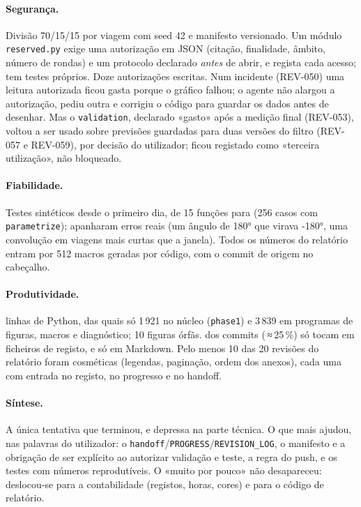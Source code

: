 \documentclass[11pt,a4paper]{article}
\begin{document}
\paragraph{Segurança.} Divisão 70/15/15 por viagem com seed 42 e manifesto versionado.
Um módulo \texttt{reserved.py} exige uma autorização em JSON (citação, finalidade, âmbito, número
de rondas) e um protocolo declarado \emph{antes} de abrir, e regista cada acesso; tem testes
próprios. Doze autorizações escritas. Num incidente (REV-050) uma leitura autorizada ficou gasta
porque o gráfico falhou; o agente não alargou a autorização, pediu outra e corrigiu o código para
guardar os dados antes de desenhar. Mas o \texttt{validation}, declarado «gasto» após a medição
final (REV-053), voltou a ser usado sobre previsões guardadas para duas versões do filtro (REV-057
e REV-059), por decisão do utilizador; ficou registado como «terceira utilização», não bloqueado.

\paragraph{Fiabilidade.} Testes sintéticos desde o primeiro dia, de 15 funções para
\mQuatroFuncTestes{} (256 casos com \texttt{parametrize}); apanharam erros reais (um ângulo de
180° que virava -180°, uma convolução em viagens mais curtas que a janela). Todos os números do
relatório entram por 512 macros geradas por código, com o commit de origem no cabeçalho.

\paragraph{Produtividade.} \mQuatroLinhasPy{} linhas de Python, das quais só 1\,921 no
núcleo (\texttt{phase1}) e 3\,839 em programas de figuras, macros e diagnóstico; 10 figuras
órfãs. \mQuatroRegisto{} dos \mQuatroCommits{} commits (\,≈\,25\,\%) só tocam em ficheiros de
registo, e \mQuatroSoMd{} só em Markdown. Pelo menos 10 das 20 revisões do relatório foram
cosméticas (legendas, paginação, ordem dos anexos), cada uma com entrada no registo, no progresso
e no handoff.

\paragraph{Síntese.} A única tentativa que terminou, e depressa na parte técnica. O que mais ajudou, nas palavras do
utilizador: o \texttt{handoff}/\texttt{PROGRESS}/\texttt{REVISION\_LOG}, o manifesto e a
obrigação de ser explícito ao autorizar validação e teste, a regra do push, e os testes com
números reprodutíveis. O «muito por pouco» não desapareceu: deslocou-se para a contabilidade
(registos, horas, cores) e para o código de relatório.
\end{document}
